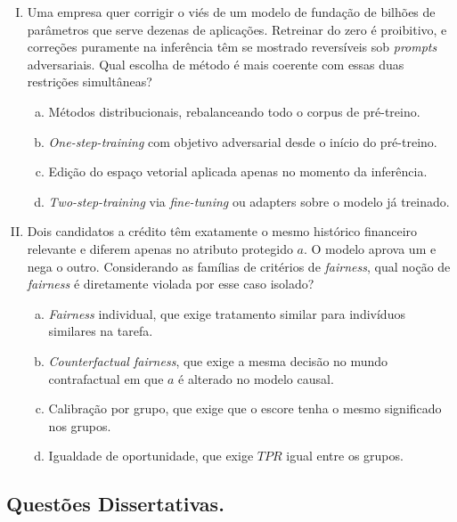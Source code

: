 \documentclass{dlproblemset}
\begin{document}
\begin{enumerate}[I)]
    \item {} Uma empresa quer corrigir o viés de um modelo de fundação de bilhões de parâmetros que serve dezenas de aplicações. Retreinar do zero é proibitivo, e correções puramente na inferência têm se mostrado reversíveis sob \textit{prompts} adversariais. Qual escolha de método é mais coerente com essas duas restrições simultâneas?
    \begin{enumerate}[(a)]
        \item Métodos distribucionais, rebalanceando todo o corpus de pré-treino.
        \item \textit{One-step-training} com objetivo adversarial desde o início do pré-treino.
        \item Edição do espaço vetorial aplicada apenas no momento da inferência.
        \item \textit{Two-step-training} via \textit{fine-tuning} ou adapters sobre o modelo já treinado.
    \end{enumerate}

    \item Dois candidatos a crédito têm exatamente o mesmo histórico financeiro relevante e diferem apenas no atributo protegido $a$. O modelo aprova um e nega o outro. Considerando as famílias de critérios de \textit{fairness}, qual noção de \textit{fairness} é diretamente violada por esse caso isolado?
    \begin{enumerate}[(a)]
        \item \textit{Fairness} individual, que exige tratamento similar para indivíduos similares na tarefa.
        \item \textit{Counterfactual fairness}, que exige a mesma decisão no mundo contrafactual em que $a$ é alterado no modelo causal.
        \item Calibração por grupo, que exige que o escore tenha o mesmo significado nos grupos.
        \item Igualdade de oportunidade, que exige $TPR$ igual entre os grupos.
    \end{enumerate}

\end{enumerate}

\subsection*{Questões Dissertativas.}
\end{document}
